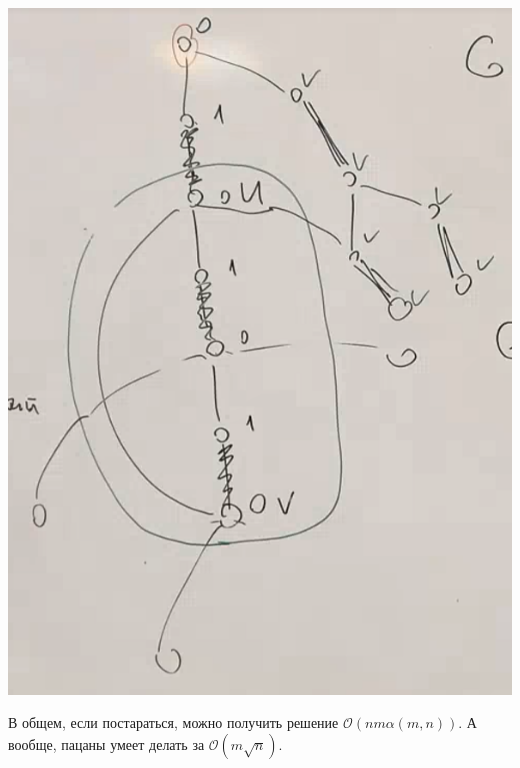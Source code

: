 \begin{center}
    \includegraphics[scale=0.5]{img/parsoch_blossom_cut_fast_dfs}
\end{center}

В общем, если постараться, можно получить решение $\mathcal{O}(n m \alpha (m, n))$.
А вообще, пацаны умеет делать за $\mathcal{O}(m \sqrt{n})$.

\endinput